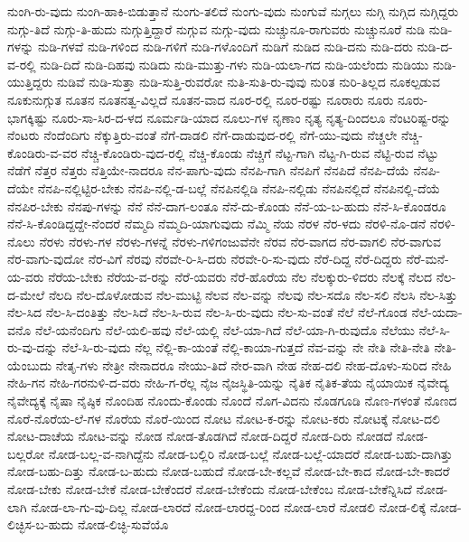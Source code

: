 ನುಂಗಿ-ರು-ವುದು
ನುಂಗಿ-ಹಾಕಿ-ಬಿಡುತ್ತಾನೆ
ನುಂಗು-ತಲಿದೆ
ನುಂಗು-ವುದು
ನುಂಗುವೆ
ನುಗ್ಗಲು
ನುಗ್ಗಿ
ನುಗ್ಗಿದ
ನುಗ್ಗಿದ್ದರು
ನುಗ್ಗು-ತಿದೆ
ನುಗ್ಗು-ತಿ-ಹುದು
ನುಗ್ಗುತ್ತಿದ್ದಾರೆ
ನುಗ್ಗುವ
ನುಗ್ಗು-ವುದು
ನುಚ್ಚುನೂ-ರಾಗುವರು
ನುಚ್ಚುನೂರೆ
ನುಡಿ
ನುಡಿ-ಗಳನ್ನು
ನುಡಿ-ಗಳವೆ
ನುಡಿ-ಗಳಿಂದ
ನುಡಿ-ಗಳಿಗೆ
ನುಡಿ-ಗಳೊಂದಿಗೆ
ನುಡಿಗೆ
ನುಡಿದ
ನುಡಿ-ದನು
ನುಡಿ-ದರು
ನುಡಿ-ದ-ವ-ರಲ್ಲಿ
ನುಡಿ-ದಿದೆ
ನುಡಿ-ದಿಹವು
ನುಡಿದು
ನುಡಿ-ಮುತ್ತು-ಗಳು
ನುಡಿ-ಯಲಾ-ಗದ
ನುಡಿ-ಯಲೆಂದು
ನುಡಿಯು
ನುಡಿ-ಯುತ್ತಿದ್ದರು
ನುಡಿವೆ
ನುಡಿ-ಸುತ್ತಾ
ನುಡಿ-ಸುತ್ತಿ-ರುವರೋ
ನುತಿ-ಸುತಿ-ರು-ವುವು
ನುರಿತ
ನುರಿ-ತಿಲ್ಲದ
ನೂಕಲ್ಪಡುವ
ನೂಕುನುಗ್ಗುತ
ನೂತನ
ನೂತನತ್ವ-ವಿಲ್ಲದೆ
ನೂತನ-ವಾದ
ನೂರ-ರಲ್ಲಿ
ನೂರ-ರಷ್ಟು
ನೂರಾರು
ನೂರು
ನೂರು-ಭಾಗಕ್ಕಿಷ್ಟು
ನೂರು-ಸಾ-ಸಿರ-ದ-ಳದ
ನೂರ್ಮಡಿ-ಯಾದ
ನೂಲು-ಗಳ
ನೃಣಾಂ
ನೃತ್ಯ
ನೃತ್ಯ-ದಿಂದಲೂ
ನೆಂಟರಿಷ್ಟ-ರನ್ನು
ನೆಂಟರು
ನೆಂದೆಂದಿಗು
ನೆಕ್ಕುತ್ತಿರು-ವಂತೆ
ನೆಗೆ-ದಾಡಲಿ
ನೆಗೆ-ದಾಡುವುದ-ರಲ್ಲಿ
ನೆಗೆ-ಯು-ವುದು
ನೆಚ್ಚಲೇ
ನೆಚ್ಚಿ-ಕೊಂಡಿರು-ವ-ವರ
ನೆಚ್ಚಿ-ಕೊಂಡಿರು-ವುದ-ರಲ್ಲಿ
ನೆಚ್ಚಿ-ಕೊಂಡು
ನೆಚ್ಚಿಗೆ
ನೆಟ್ಟ-ಗಾಗಿ
ನೆಟ್ಟ-ಗಿ-ರುವ
ನೆಟ್ಟಿ-ರುವ
ನೆಟ್ಟು
ನೆಡೆಗೆ
ನೆತ್ತರ
ನೆತ್ತರು
ನೆತ್ತಿಯೇ-ನಾದರೂ
ನೆನ-ಪಾಗು-ವುದು
ನೆನಪಿ-ಗಾಗಿ
ನೆನಪಿಗೆ
ನೆನಪಿದೆ
ನೆನಪಿ-ದೆಯೆ
ನೆನಪಿ-ದೆಯೇ
ನೆನಪಿ-ನಲ್ಲಿಟ್ಟಿರ-ಬೇಕು
ನೆನಪಿ-ನಲ್ಲಿ-ಡ-ಬಲ್ಲೆ
ನೆನಪಿನಲ್ಲಿಡಿ
ನೆನಪಿ-ನಲ್ಲಿಡು
ನೆನಪಿನಲ್ಲಿದೆ
ನೆನಪಿನಲ್ಲಿ-ದೆಯೆ
ನೆನಪಿರ-ಬೇಕು
ನೆನಪು-ಗಳನ್ನು
ನೆನೆ
ನೆನೆ-ದಾಗ-ಲಂತೂ
ನೆನೆ-ದು-ಕೊಂಡು
ನೆನೆ-ಯ-ಬ-ಹುದು
ನೆನೆ-ಸಿ-ಕೊಂಡರೂ
ನೆನೆ-ಸಿ-ಕೊಂಡಿದ್ದದ್ದೇ-ನೆಂದರೆ
ನೆಮ್ಮದಿ
ನೆಮ್ಮದಿ-ಯಾಗುವುದು
ನೆಮ್ಮಿ
ನೆಯ
ನೆರಳ
ನೆರ-ಳದು
ನೆರಳಿ-ನೊ-ಡನೆ
ನೆರಳಿ-ನೊಲು
ನೆರಳು
ನೆರಳು-ಗಳ
ನೆರಳು-ಗಳನ್ನೆ
ನೆರಳು-ಗಳಿಗಂಜುವೆನೇ
ನೆರವ
ನೆರ-ವಾಗದ
ನೆರ-ವಾಗಲಿ
ನೆರ-ವಾಗುವ
ನೆರ-ವಾಗು-ವುದೋ
ನೆರ-ವಿಗೆ
ನೆರವು
ನೆರವೇ-ರಿ-ಸಿ-ದರು
ನೆರವೇ-ರಿ-ಸು-ವುದು
ನೆರೆ-ದಿದ್ದ
ನೆರೆ-ದಿದ್ದರು
ನೆರೆ-ಮನೆ-ಯ-ವರು
ನೆರೆಯ-ಬೇಕು
ನೆರೆಯ-ವ-ರನ್ನು
ನೆರೆ-ಯವರು
ನೆರೆ-ಹೊರೆಯ
ನೆಲ
ನೆಲಕ್ಕುರು-ಳಿದರು
ನೆಲಕ್ಕೆ
ನೆಲದ
ನೆಲ-ದ-ಮೇಲೆ
ನೆಲದಿ
ನೆಲ-ದೊಳೋಡುವ
ನೆಲ-ಮುಟ್ಟಿ
ನೆಲವ
ನೆಲ-ವನ್ನು
ನೆಲವು
ನೆಲ-ಸದೊ
ನೆಲ-ಸಲಿ
ನೆಲಸಿ
ನೆಲ-ಸಿತ್ತು
ನೆಲ-ಸಿದ
ನೆಲ-ಸಿ-ದಂತಿತ್ತು
ನೆಲ-ಸಿದೆ
ನೆಲ-ಸಿ-ರುವ
ನೆಲ-ಸಿ-ರು-ವುದು
ನೆಲ-ಸು-ವಂತೆ
ನೆಲೆ
ನೆಲೆ-ಗೊಂಡ
ನೆಲೆ-ಯದಾ-ವನೊ
ನೆಲೆ-ಯನೆಂದಿಗು
ನೆಲೆ-ಯಲಿ-ಹವು
ನೆಲೆ-ಯಲ್ಲಿ
ನೆಲೆ-ಯಾ-ಗಿದೆ
ನೆಲೆ-ಯಾ-ಗಿ-ರುವುದೊ
ನೆಲೆಯು
ನೆಲೆ-ಸಿ-ರು-ವು-ದನ್ನು
ನೆಲೆ-ಸಿ-ರು-ವುದು
ನೆಲ್ಲ
ನೆಲ್ಲಿ-ಕಾ-ಯಂತೆ
ನೆಲ್ಲಿ-ಕಾಯಾ-ಗುತ್ತದೆ
ನೆವ-ವನ್ನು
ನೇ
ನೇತಿ
ನೇತಿ-ನೇತಿ
ನೇತಿ-ಯೆಂಬುದು
ನೇತೃ-ಗಳು
ನೇತ್ರೀ
ನೇನಾದರೂ
ನೇಯು-ತಿದೆ
ನೇರ-ವಾಗಿ
ನೇಹ
ನೇಹ-ದಲಿ
ನೇಹ-ದೊಳು-ಸುರಿದ
ನೇಹಿ
ನೇಹಿ-ಗನ
ನೇಹಿ-ಗರನುಳಿ-ದ-ವರು
ನೇಹಿ-ಗ-ರೆಲ್ಲ
ನೈಜ
ನೈಜಸ್ಥಿತಿ-ಯನ್ನು
ನೈತಿಕ
ನೈತಿಕ-ತೆಯ
ನೈಯಾಯಿಕ
ನೈವೇದ್ಯ
ನೈವೇದ್ಯಕ್ಕೆ
ನೈಷಾ
ನೈಷ್ಠಿಕ
ನೊಂದಿಹ
ನೊಂದು-ಕೊಂಡು
ನೊಂದೆ
ನೊಗ-ವಿದನು
ನೊಡಗೂಡಿ
ನೊಣ-ಗಳಂತೆ
ನೊಣದ
ನೊರೆ-ನೊರೆಯ-ಲೆ-ಗಳ
ನೊರೆಯ
ನೊರೆ-ಯಿಂದ
ನೋಟ
ನೋಟ-ಕ-ರನ್ನು
ನೋಟ-ಕರು
ನೋಟಕ್ಕೆ
ನೋಟ-ದಲಿ
ನೋಟ-ದಾಚೆಯ
ನೋಟ-ವನ್ನು
ನೋಡ
ನೋಡ-ತೊಡಗಿದೆ
ನೋಡ-ದಿದ್ದರೆ
ನೋಡ-ದಿರು
ನೋಡದೆ
ನೋಡ-ಬಲ್ಲರೋ
ನೋಡ-ಬಲ್ಲ-ವ-ನಾಗಿದ್ದೆನು
ನೋಡ-ಬಲ್ಲಿರಿ
ನೋಡ-ಬಲ್ಲೆ
ನೋಡ-ಬಲ್ಲೆ-ಯಾದರೆ
ನೋಡ-ಬಹು-ದಾಗಿತ್ತು
ನೋಡ-ಬಹು-ದಿತ್ತು
ನೋಡ-ಬ-ಹುದು
ನೋಡ-ಬಹುದೆ
ನೋಡ-ಬೇ-ಕಲ್ಲವೆ
ನೋಡ-ಬೇ-ಕಾದ
ನೋಡ-ಬೇ-ಕಾದರೆ
ನೋಡ-ಬೇಕು
ನೋಡ-ಬೇಕೆ
ನೋಡ-ಬೇಕೆಂದರೆ
ನೋಡ-ಬೇಕೆಂದು
ನೋಡ-ಬೇಕೆಂಬ
ನೋಡ-ಬೇಕೆನ್ನಿಸಿದೆ
ನೋಡ-ಲಾಗಿ
ನೋಡ-ಲಾ-ಗು-ವು-ದಿಲ್ಲ
ನೋಡ-ಲಾರದೆ
ನೋಡ-ಲಾರದ್ದ-ರಿಂದ
ನೋಡ-ಲಾರೆ
ನೋಡಲಿ
ನೋಡ-ಲಿಕ್ಕೆ
ನೋಡ-ಲಿಚ್ಛಿಸ-ಬ-ಹುದು
ನೋಡ-ಲಿಚ್ಛಿ-ಸುವೆಯೊ
